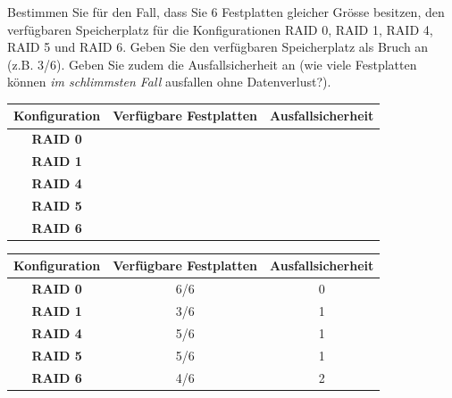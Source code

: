 \begin{myexercise}
    Bestimmen Sie für den Fall, dass Sie 6 Festplatten gleicher Grösse besitzen, den verfügbaren Speicherplatz für die Konfigurationen \gls{RAID} 0, \gls{RAID} 1, \gls{RAID} 4, \gls{RAID} 5 und \gls{RAID} 6. Geben Sie den verfügbaren Speicherplatz als Bruch an (z.B. 3/6). Geben Sie zudem die Ausfallsicherheit an (wie viele Festplatten können \textit{im schlimmsten Fall} ausfallen ohne Datenverlust?).

    \begin{table}[H]
        \centering
        \begin{tabular}{ccc}
            \textbf{Konfiguration} & \textbf{Verfügbare Festplatten} & \textbf{Ausfallsicherheit} \\\midrule
            \textbf{\gls{RAID} 0}  &                                 &                            \\[1cm]\midrule
            \textbf{\gls{RAID} 1}  &                                 &                            \\[1cm]\midrule
            \textbf{\gls{RAID} 4}  &                                 &                            \\[1cm]\midrule
            \textbf{\gls{RAID} 5}  &                                 &                            \\[1cm]\midrule
            \textbf{\gls{RAID} 6}  &                                 &                            \\[1cm]
        \end{tabular}
    \end{table}
    \begin{myanswer}
        \begin{table}[H]
            \centering
            \begin{tabular}{ccc}
                \textbf{Konfiguration} & \textbf{Verfügbare Festplatten} & \textbf{Ausfallsicherheit} \\\midrule
                \textbf{\gls{RAID} 0}  & 6/6                             & 0                          \\\midrule
                \textbf{\gls{RAID} 1}  & 3/6                             & 1                          \\\midrule
                \textbf{\gls{RAID} 4}  & 5/6                             & 1                          \\\midrule
                \textbf{\gls{RAID} 5}  & 5/6                             & 1                          \\\midrule
                \textbf{\gls{RAID} 6}  & 4/6                             & 2                          \\
            \end{tabular}
        \end{table}
    \end{myanswer}
\end{myexercise}


